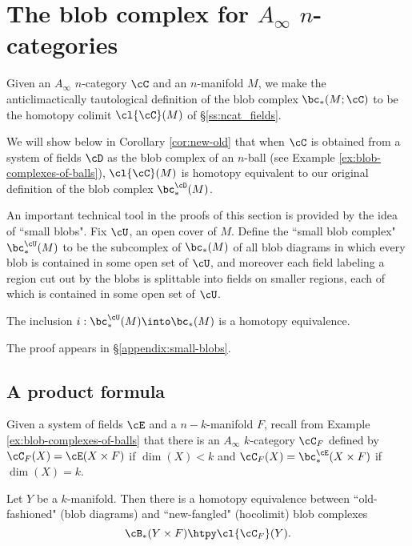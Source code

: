 
\section{The blob complex for $A_\infty$ $n$-categories}
\label{sec:ainfblob}
Given an $A_\infty$ $n$-category $\cC$ and an $n$-manifold $M$, we make the anticlimactically tautological definition of the blob
complex $\bc_*(M;\cC)$ to be the homotopy colimit $\cl{\cC}(M)$ of \S\ref{ss:ncat_fields}.

We will show below 
in Corollary \ref{cor:new-old}
that when $\cC$ is obtained from a system of fields $\cD$ 
as the blob complex of an $n$-ball (see Example \ref{ex:blob-complexes-of-balls}), 
$\cl{\cC}(M)$ is homotopy equivalent to
our original definition of the blob complex $\bc_*^\cD(M)$.

\medskip

An important technical tool in the proofs of this section is provided by the idea of ``small blobs".
Fix $\cU$, an open cover of $M$.
Define the ``small blob complex" $\bc^{\cU}_*(M)$ to be the subcomplex of $\bc_*(M)$ 
of all blob diagrams in which every blob is contained in some open set of $\cU$, 
and moreover each field labeling a region cut out by the blobs is splittable 
into fields on smaller regions, each of which is contained in some open set of $\cU$.

\begin{thm} \label{thm:small-blobs}
The inclusion $i: \bc^{\cU}_*(M) \into \bc_*(M)$ is a homotopy equivalence.
\end{thm}
The proof appears in \S \ref{appendix:small-blobs}.

\subsection{A product formula}
\label{ss:product-formula}


Given a system of fields $\cE$ and a $n{-}k$-manifold $F$, recall from 
Example \ref{ex:blob-complexes-of-balls} that there is an  $A_\infty$ $k$-category $\cC_F$ 
defined by $\cC_F(X) = \cE(X\times F)$ if $\dim(X) < k$ and
$\cC_F(X) = \bc_*^\cE(X\times F)$ if $\dim(X) = k$.


\begin{thm} \label{thm:product}
Let $Y$ be a $k$-manifold.
Then there is a homotopy equivalence between ``old-fashioned" (blob diagrams) 
and ``new-fangled" (hocolimit) blob complexes
\[
	\cB_*(Y \times F) \htpy \cl{\cC_F}(Y) .
\]\end{thm}

